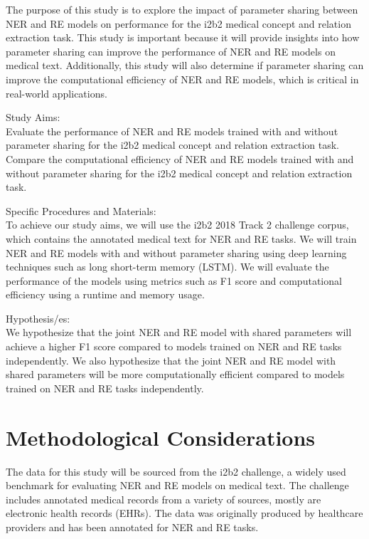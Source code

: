 \documentclass{article}
\begin{document}
The purpose of this study is to explore the impact of parameter sharing between NER and RE models on performance for the i2b2 medical concept and relation extraction task. This study is important because it will provide insights into how parameter sharing can improve the performance of NER and RE models on medical text. Additionally, this study will also determine if parameter sharing can improve the computational efficiency of NER and RE models, which is critical in real-world applications.

Study Aims:\\
Evaluate the performance of NER and RE models trained with and without parameter sharing for the i2b2 medical concept and relation extraction task. Compare the computational efficiency of NER and RE models trained with and without parameter sharing for the i2b2 medical concept and relation extraction task.

Specific Procedures and Materials:\\
To achieve our study aims, we will use the i2b2 2018 Track 2 challenge corpus, which contains the annotated medical text for NER and RE tasks. We will train NER and RE models with and without parameter sharing using deep learning techniques such as long short-term memory (LSTM). We will evaluate the performance of the models using metrics such as F1 score and computational efficiency using a runtime and memory usage.

Hypothesis/es:\\
We hypothesize that the joint NER and RE model with shared parameters will achieve a higher F1 score compared to models trained on NER and RE tasks independently. We also hypothesize that the joint NER and RE model with shared parameters will be more computationally efficient compared to models trained on NER and RE tasks independently.



\section{Methodological Considerations}

The data for this study will be sourced from the i2b2 challenge, a widely used benchmark for evaluating NER and RE models on medical text. The challenge includes annotated medical records from a variety of sources, mostly are electronic health records (EHRs). The data was originally produced by healthcare providers and has been annotated for NER and RE tasks.
\end{document}
